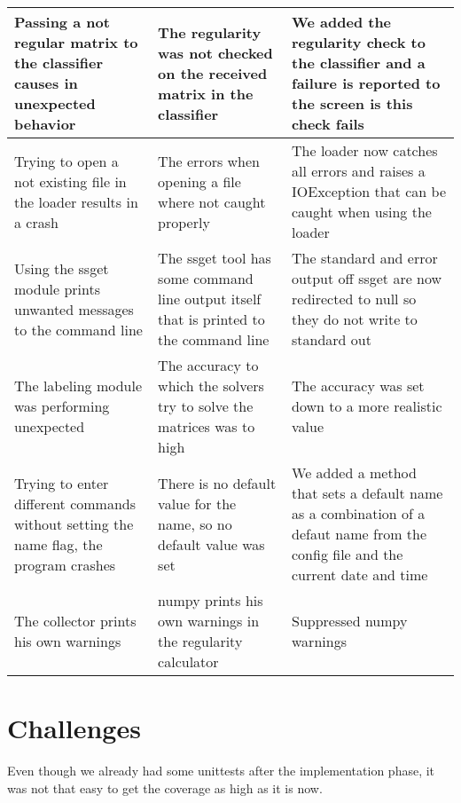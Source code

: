 \documentclass[parskip=full]{scrartcl}
\begin{document}
\begin{tabular}{|p{4.5cm}|p{4.5cm}|p{4.5cm}|}
\hline

Passing a not regular matrix to the classifier causes in unexpected behavior &
The regularity was not checked on the received matrix in the classifier &
We added the regularity check to the classifier and a failure is reported to the screen is this check fails \\

\hline

Trying to open a not existing file in the loader results in a crash &
The errors when opening a file where not caught properly &
The loader now catches all errors and raises a IOException that can be caught when using the loader \\

\hline

Using the \gls{ssget} module prints unwanted messages to the command line &
The \gls{ssget} tool has some command line output itself that is printed to the command line &
The standard and error output off \gls{ssget} are now redirected to null so they do not write to standard out \\

\hline

The labeling module was performing unexpected &
The accuracy to which the solvers try to solve the matrices was to high &
The accuracy was set down to a more realistic value \\

\hline

Trying to enter different commands without setting the name flag, the program crashes &
There is no default value for the name, so no default value was set &
We added a method that sets a default name as a combination of a defaut name from the config file and the current date and time \\

\hline

The collector prints his own warnings &
numpy prints his own warnings in the regularity calculator &
Suppressed numpy warnings \\

\hline

\end{tabular}

\newpage

\section{Challenges}

Even though we already had some \glspl{unittest} after the implementation phase, it was not that easy to get the coverage as high as it is now.
\end{document}
